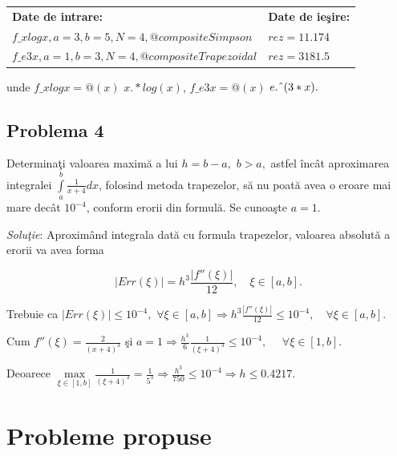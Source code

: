 \documentclass{exam}
\begin{document}
\begin{center}
	\begin{tabular}{| l | l |}
		\hline
		\textbf{Date de intrare:} & \textbf{Date de ieşire:} \\
		$f\_xlogx, a=3,b= 5, N=4, @compositeSimpson$
		                          &
		$rez =11.174 $
		\\

		$f\_e3x, a=1, b=3, N=4, @compositeTrapezoidal$

		                          &
		$rez = 3181.5$
		\\

		\hline
	\end{tabular}
\end{center}

unde  $f\_xlogx=@(x)$  $x.*log(x)$, $f\_e3x=@(x)$  $e.\char`^(3*x).$


\subsection{Problema 4}
Determina\c{t}i valoarea maxim\u{a} a lui $h=b-a,$ $b>a,$ astfel \^{i}nc\^{a}t aproximarea integralei $\int\limits_{a}^{b}\frac{1}{x+4}dx$, folosind metoda trapezelor, s\u{a} nu poat\u{a} avea o eroare mai mare decât $ 10^{-4}$, conform erorii din formul\u{a}. Se cunoa\c{s}te $a=1$.

\textit{Solu\c{t}ie}:
Aproxim\^{a}nd integrala dat\u{a} cu formula trapezelor, valoarea absolut\u{a} a erorii va avea forma

$$\left|Err(\xi)\right|=h^3\frac{\left|f''(\xi)\right|}{12}, \quad \xi\in[a,b].$$

Trebuie ca $\left|Err(\xi)\right| \leq 10^{-4},$ $ \forall\xi\in[a,b]\Rightarrow h^3\frac{\left|f''(\xi)\right|}{12}\leq 10^{-4}, \quad \forall\xi\in[a,b].$

Cum $f''(\xi)=\frac{2}{(x+4)^3}$ \c{s}i $a=1\Rightarrow \frac{h^3}{6}\frac{1}{(\xi+4)^3}\leq10^{-4},\quad $ $\forall\xi\in[1,b].$

Deoarece $\max\limits_{\xi\in\left[1,b\right]}\frac{1}{(\xi+4)^3}=\frac{1}{5^3}\Rightarrow \frac{h^3}{750}\leq 10^{-4}\Rightarrow h \leq 0.4217.$


\section{Probleme propuse}
\end{document}
